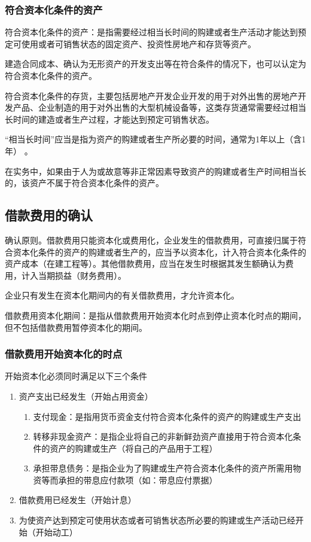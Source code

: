 \documentclass[UTF8,12pt]{ctexart}
\numberwithin{equation}{section} %
\numberwithin{figure}{section}
\numberwithin{table}{section}
\begin{document}
	\subsubsection{符合资本化条件的资产}
	
	符合资本化条件的资产：是指需要经过相当长时间的购建或者生产活动才能达到预定可使用或者可销售状态的固定资产、投资性房地产和存货等资产。
	
	建造合同成本、确认为无形资产的开发支出等在符合条件的情况下，也可以认定为符合资本化条件的资产。
	
	符合资本化条件的存货，主要包括房地产开发企业开发的用于对外出售的房地产开发产品、企业制造的用于对外出售的大型机械设备等，这类存货通常需要经过相当长时间的建造或者生产过程，才能达到预定可销售状态。
	
	“相当长时间”应当是指为资产的购建或者生产所必要的时间，通常为1年以上（含1年） 。
	
	在实务中，如果由于人为或故意等非正常因素导致资产的购建或者生产时间相当长的，该资产不属于符合资本化条件的资产。
	
	\subsection{借款费用的确认}
	确认原则。借款费用只能资本化或费用化，企业发生的借款费用，可直接归属于符合资本化条件的资产的购建或者生产的，应当予以资本化，计入符合资本化条件的资产成本（在建工程等）。其他借款费用，应当在发生时根据其发生额确认为费用，计入当期损益（财务费用）。
	
	企业只有发生在资本化期间内的有关借款费用，才允许资本化。
		
	借款费用资本化期间：是指从借款费用开始资本化时点到停止资本化时点的期间，但不包括借款费用暂停资本化的期间。
	
	\subsubsection{借款费用开始资本化的时点}
	开始资本化必须同时满足以下三个条件
	\begin{enumerate}
		\item 资产支出已经发生（开始占用资金）
		\begin{enumerate}
			\item 支付现金：是指用货币资金支付符合资本化条件的资产的购建或生产支出
			
			\item 转移非现金资产：是指企业将自己的非新鲜劲资产直接用于符合资本化条件的资产的购建或生产（将自己的产品用于工程）
			
			\item 承担带息债务：是指企业为了购建或生产符合资本化条件的资产所需用物资等而承担的带息应付款项（如：带息应付票据）
		\end{enumerate}
		
		\item 借款费用已经发生（开始计息）
		
		\item 为使资产达到预定可使用状态或者可销售状态所必要的购建或生产活动已经开始（开始动工）
	\end{enumerate}
	
\end{document}
